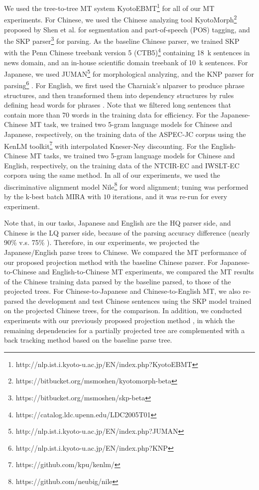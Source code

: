 \documentclass[english]{jnlp_1.4}
\begin{document}
We used the tree-to-tree MT system KyotoEBMT\footnote{{http://nlp.ist.i.kyoto-u.ac.jp/EN/index.php?KyotoEBMT}}
\cite{richardson-EtAl:2015:WAT} for all of our MT experiments. For Chinese, we used
the Chinese analyzing tool KyotoMorph\footnote{https://bitbucket.org/msmoshen/kyotomorph-beta} 
proposed by Shen et al. \cite{shen-EtAl:2014:P14-2} for segmentation
and part-of-speech (POS) tagging, and the SKP parser\footnote{https://bitbucket.org/msmoshen/skp-beta} 
\cite{shen-kawahara-kurohashi:2012:PACLIC} for parsing.
As the baseline Chinese parser, we trained SKP with the Penn Chinese treebank version 5 
(CTB5)\footnote{https://catalog.ldc.upenn.edu/LDC2005T01} containing 18~k sentences in news domain,
and an in-house scientific 
domain treebank of 10~k sentences. For Japanese, we used 
JUMAN\footnote{http://nlp.ist.i.kyoto-u.ac.jp/EN/index.php?JUMAN} \cite{kurohashi--EtAl:1994}
for morphological analyzing,
and the KNP parser for parsing\footnote{http://nlp.ist.i.kyoto-u.ac.jp/EN/index.php?KNP}
\cite{kawahara-kurohashi:2006:HLT-NAACL06-Main}. 
For English, we first used the Charniak's nlparser \cite{charniak-johnson:2005:ACL} to produce phrase 
structures, and then transformed them into dependency structures by rules defining
head words for phrases \cite{Collins:2003:HSM:1105703.1105706}. 
{Note that we filtered long sentences that contain more than 70 words in the training data for efficiency.}
For the Japanese-Chinese MT task, we trained two 5-gram language models for Chinese and Japanese, 
respectively, on the training data of the ASPEC-JC corpus using the KenLM toolkit\footnote{https://github.com/kpu/kenlm/} 
with interpolated Kneser-Ney discounting. For the English-Chinese MT {tasks}, we trained two 5-gram language 
models for Chinese and English, respectively, on the training data of the NTCIR-EC {and IWSLT-EC corpora} using the same method.
In all of our experiments, we used the discriminative 
alignment model Nile\footnote{https://github.com/neubig/nile} \cite{riesa-irvine-marcu:2011:EMNLP} for word alignment; 
tuning was performed by the k-best batch MIRA \cite{cherry-foster:2012:NAACL-HLT} with $10$ iterations, and it was 
re-run for every experiment.

Note that, in our tasks, Japanese and English are the HQ parser side, and Chinese is the LQ parser side,
because of the parsing accuracy difference ({nearly} 90\% \cite{kawahara-kurohashi:2006:HLT-NAACL06-Main,charniak-johnson:2005:ACL} 
v.s. {75\% \cite{hatori-EtAl:2012:ACL2012}}). Therefore, in our experiments, we 
projected the Japanese/English parse trees to Chinese. We compared the MT performance of our proposed 
projection method with the baseline Chinese parser. For Japanese-to-Chinese and English-to-Chinese MT experiments, 
we compared the MT results of the Chinese training data parsed by the baseline parsed, to 
those of the projected trees. For Chinese-to-Japanese and Chinese-to-English MT, we also re-parsed the development 
and test Chinese sentences using the SKP model trained on the projected Chinese trees, for 
the comparison. {In addition, we conducted experiments with our previously proposed 
projection method \cite{Shen2015a}, in which the remaining dependencies for a partially 
projected tree are complemented with a back tracking method based on the baseline parse tree.}
\end{document}
